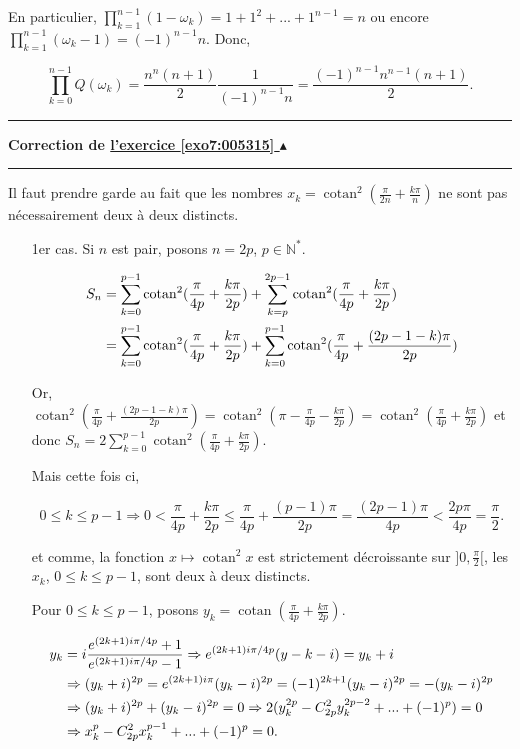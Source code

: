 \documentclass[11pt,a4paper]{article}
\newcommand{\Nn}{\mathbb{N}} \newcommand{\N}{\mathbb{N}}
\newcommand{\cotan}{\mathop{\mathrm{cotan}}\nolimits}
\newcounter{exo}
\newcommand{\correction}[1]{\hypertarget{cor7:#1}{}\label{cor7:#1}{\bf Correction de \hyperlink{exo7:#1}{l'exercice \ref{exo7:#1} $\blacktriangle$}}\vspace{1mm}\hrule\vspace{1mm}}
\newcommand{\fincorrection}{\vspace{1mm}\hrule\vspace*{7mm}}
\begin{document}
En particulier, $\prod_{k=1}^{n-1}(1-\omega_k)=1+1^2+...+1^{n-1}=n$ ou encore $\prod_{k=1}^{n-1}(\omega_k-1)=(-1)^{n-1}n$.
Donc,

$$\prod_{k=0}^{n-1}Q(\omega_k)=\frac{n^n(n+1)}{2}\frac{1}{(-1)^{n-1}n}=\frac{(-1)^{n-1}n^{n-1}(n+1)}{2}.$$

\fincorrection
\correction{005315}
Il faut prendre garde au fait que les nombres $x_k=\cotan^2(\frac{\pi}{2n}+\frac{k\pi}{n})$ ne sont pas nécessairement deux à deux distincts.

\begin{itemize}
\item[1er cas.] Si $n$ est pair, posons $n=2p$, $p\in\Nn^*$.

\begin{align*}\ensuremath
S_n&=\sum_{k=0}^{p-1}\cotan^2(\frac{\pi}{4p}+\frac{k\pi}{2p})+\sum_{k=p}^{2p-1}\cotan^2(\frac{\pi}{4p}+\frac{k\pi}{2p})\\
 &=\sum_{k=0}^{p-1}\cotan^2(\frac{\pi}{4p}+\frac{k\pi}{2p})+\sum_{k=0}^{p-1}\cotan^2(\frac{\pi}{4p}+\frac{(2p-1-k)\pi}{2p})
\end{align*}
 
Or, $\cotan^2(\frac{\pi}{4p}+\frac{(2p-1-k)\pi}{2p})=\cotan^2(\pi-\frac{\pi}{4p}-\frac{k\pi}{2p})=\cotan^2(\frac{\pi}{4p}+\frac{k\pi}{2p})$ et donc $S_n=2\sum_{k=0}^{p-1}\cotan^2(\frac{\pi}{4p}+\frac{k\pi}{2p})$.

Mais cette fois ci, 

$$0\leq k\leq p-1\Rightarrow 0<\frac{\pi}{4p}+\frac{k\pi}{2p}\leq\frac{\pi}{4p}+\frac{(p-1)\pi}{2p}=\frac{(2p-1)\pi}{4p}<\frac{2p\pi}{4p}=\frac{\pi}{2}.$$

et comme, la fonction $x\mapsto\cotan^2x$ est strictement décroissante sur $]0,\frac{\pi}{2}[$, les $x_k$, $0\leq k\leq p-1$, sont deux à deux distincts.

Pour $0\leq k\leq p-1$, posons $y_k=\cotan(\frac{\pi}{4p}+\frac{k\pi}{2p})$.

\begin{align*}\ensuremath
y_k&=i\frac{e^{(2k+1)i\pi/4p}+1}{e^{(2k+1)i\pi/4p}-1}\Rightarrow e^{(2k+1)i\pi/4p}(y-k-i)=y_k+i\\
 &\Rightarrow(y_k+i)^{2p}=e^{(2k+1)i\pi}(y_k-i)^{2p}=(-1)^{2k+1}(y_k-i)^{2p}=-(y_k-i)^{2p}\\
 &\Rightarrow(y_k+i)^{2p}+(y_k-i)^{2p}=0\Rightarrow2(y_k^{2p}-C_{2p}^2y_k^{2p-2}+...+(-1)^p)=0\\
 &\Rightarrow x_k^p-C_{2p}^2x_k^{p-1}+...+(-1)^p=0.
\end{align*}


\end{itemize}
\end{document}
